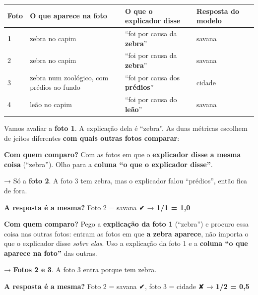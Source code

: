 \documentclass[11pt,a4paper]{article}
\newenvironment{paircol}[2]{\begin{tcolorbox}[width=0.485\linewidth, nobeforeafter, box align=top, boxrule=0.5pt,
  colframe=black!25, colback=white, borderline north={3pt}{0pt}{pair#1}, left=5pt, right=5pt,
  before upper={{\color{pair#1}\small\textbf{\MakeUppercase{#2}}}\par}]}{\end{tcolorbox}}
\begin{document}
\begin{center}\small
\begin{tabularx}{\linewidth}{XXXX}
\toprule
\textbf{Foto} & \textbf{O que aparece na foto} & \textbf{O que o explicador disse} & \textbf{Resposta do modelo} \\
\midrule
\textbf{1} & zebra no capim & “foi por causa da \textbf{zebra}” & savana \\
2 & zebra no capim & “foi por causa da \textbf{zebra}” & savana \\
3 & zebra num zoológico, com prédios ao fundo & “foi por causa dos \textbf{prédios}” & cidade \\
4 & leão no capim & “foi por causa do \textbf{leão}” & savana \\
\bottomrule
\end{tabularx}
\end{center}

Vamos avaliar a \textbf{foto 1}. A explicação dela é “zebra”. As duas métricas escolhem de jeitos diferentes \textbf{com quais outras fotos comparar}:

\noindent
\begin{paircol}{c}{Consistency}
\textbf{Com quem comparo?} Com as fotos em que o \textbf{explicador disse a mesma coisa} (“zebra”). Olho para a \textbf{coluna “o que o explicador disse”}.

→ Só a \textbf{foto 2}. A foto 3 tem zebra, mas o explicador falou “prédios”, então fica de fora.

\textbf{A resposta é a mesma?} Foto 2 = savana ✔ → \textbf{1/1 = 1,0}
\end{paircol}
\hfill
\begin{paircol}{s}{Sufficiency}
\textbf{Com quem comparo?} Pego a \textbf{explicação da foto 1} (“zebra”) e procuro essa coisa nas outras fotos: entram as fotos em que \textbf{a zebra aparece}, não importa o que o explicador disse \textit{sobre elas}. Uso a explicação da foto 1 e a \textbf{coluna “o que aparece na foto”} das outras.

→ \textbf{Fotos 2 e 3}. A foto 3 entra porque tem zebra.

\textbf{A resposta é a mesma?} Foto 2 = savana ✔, foto 3 = cidade ✘ → \textbf{1/2 = 0,5}
\end{paircol}
\end{document}
